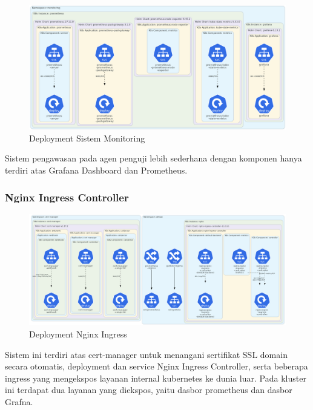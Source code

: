 \begin{figure}[htbp]
    \centering
    \includegraphics[width=1\textwidth]{resources/chapter-4/agent-monitoring.png}
    \caption{Deployment Sistem Monitoring}
    \label{fig:deployment-monitoring-agent}
\end{figure}

Sistem pengawasan pada agen penguji lebih sederhana dengan komponen hanya terdiri atas Grafana Dashboard dan Prometheus.

\pagebreak

\subsubsection{Nginx Ingress Controller}

\begin{figure}[htbp]
    \centering
    \includegraphics[width=1\textwidth]{resources/chapter-4/agent-nginx.png}
    \caption{Deployment Nginx Ingress}
    \label{fig:deployment-nginx-agent}
\end{figure}

Sistem ini terdiri atas cert-manager untuk menangani sertifikat SSL domain secara otomatis, deployment dan service Nginx Ingress Controller, serta beberapa ingress yang mengekspos layanan internal kubernetes ke dunia luar. Pada kluster ini terdapat dua layanan yang diekspos, yaitu dasbor prometheus dan dasbor Grafna.

